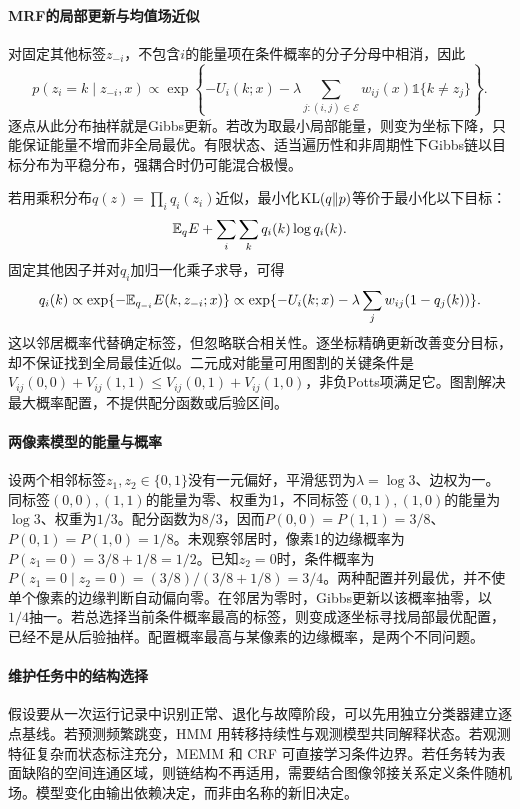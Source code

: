 \paragraph{MRF的局部更新与均值场近似}
对固定其他标签$z_{-i}$，不包含$i$的能量项在条件概率的分子分母中相消，因此
\begin{equation}
 p(z_i=k\mid z_{-i},x)\propto
 \exp\left\{-U_i(k;x)-\lambda\sum_{j:(i,j)\in\mathcal E}w_{ij}(x)\mathbb 1\{k\ne z_j\}\right\}.
\end{equation}
逐点从此分布抽样就是Gibbs更新。若改为取最小局部能量，则变为坐标下降，只能保证能量不增而非全局最优。有限状态、适当遍历性和非周期性下Gibbs链以目标分布为平稳分布，强耦合时仍可能混合极慢。

若用乘积分布$q(z)=\prod_iq_i(z_i)$近似，最小化$\operatorname{KL}(q\|p)$等价于最小化以下目标：
\begin{equation}
 \mathbb{E}_qE+\sum_i\sum_kq_i(k)\log q_i(k).
\end{equation}
固定其他因子并对$q_i$加归一化乘子求导，可得
\begin{equation}
 q_i(k)\propto\exp\{-\mathbb{E}_{q_{-i}}E(k,z_{-i};x)\}
 \propto\exp\{-U_i(k;x)-\lambda\sum_jw_{ij}(1-q_j(k))\}.
\end{equation}
这以邻居概率代替确定标签，但忽略联合相关性。逐坐标精确更新改善变分目标，却不保证找到全局最佳近似。二元成对能量可用图割的关键条件是$V_{ij}(0,0)+V_{ij}(1,1)\leq V_{ij}(0,1)+V_{ij}(1,0)$，非负Potts项满足它。图割解决最大概率配置，不提供配分函数或后验区间。

\paragraph{两像素模型的能量与概率}
设两个相邻标签$z_1,z_2\in\{0,1\}$没有一元偏好，平滑惩罚为$\lambda=\log3$、边权为一。同标签$(0,0),(1,1)$的能量为零、权重为1，不同标签$(0,1),(1,0)$的能量为$\log3$、权重为$1/3$。配分函数为$8/3$，因而$P(0,0)=P(1,1)=3/8$、$P(0,1)=P(1,0)=1/8$。未观察邻居时，像素1的边缘概率为$P(z_1=0)=3/8+1/8=1/2$。已知$z_2=0$时，条件概率为$P(z_1=0\mid z_2=0)=(3/8)/(3/8+1/8)=3/4$。两种配置并列最优，并不使单个像素的边缘判断自动偏向零。在邻居为零时，Gibbs更新以该概率抽零，以$1/4$抽一。若总选择当前条件概率最高的标签，则变成逐坐标寻找局部最优配置，已经不是从后验抽样。配置概率最高与某像素的边缘概率，是两个不同问题。

\paragraph{维护任务中的结构选择}
假设要从一次运行记录中识别正常、退化与故障阶段，可以先用独立分类器建立逐点基线。若预测频繁跳变，HMM 用转移持续性与观测模型共同解释状态。若观测特征复杂而状态标注充分，MEMM 和 CRF 可直接学习条件边界。若任务转为表面缺陷的空间连通区域，则链结构不再适用，需要结合图像邻接关系定义条件随机场。模型变化由输出依赖决定，而非由名称的新旧决定。

